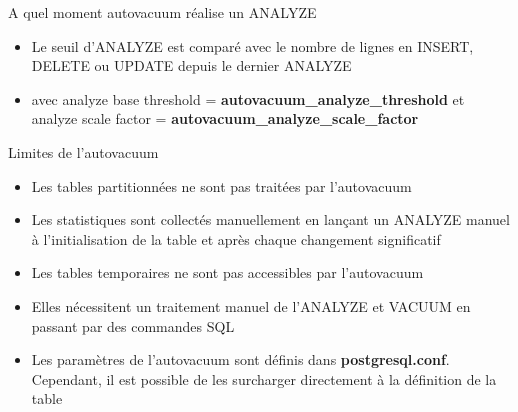 
\begin{frame}[fragile]{A quel moment autovacuum réalise un ANALYZE}

\begin{itemize}
\begin{tiny}
\begin{Verbatim}[commandchars=\\\{\}]
analyze threshold = analyze base threshold + analyze scale factor * number of tuples
\end{Verbatim}
\end{tiny}
   \item Le seuil d'ANALYZE est comparé avec le nombre de lignes en INSERT, DELETE ou UPDATE depuis le dernier ANALYZE
   \item avec analyze base threshold = \textbf{autovacuum\_analyze\_threshold} et analyze scale factor = \textbf{autovacuum\_analyze\_scale\_factor}

\end{itemize}

\end{frame}


\begin{frame}[fragile]{Limites de l'autovacuum}

\begin{itemize}
   \item Les tables partitionnées ne sont pas traitées par l'autovacuum
   \item Les statistiques sont collectés manuellement en lançant un ANALYZE manuel à l'initialisation de la table et après chaque changement significatif
   \item Les tables temporaires ne sont pas accessibles par l'autovacuum
   \item Elles nécessitent un traitement manuel de l'ANALYZE et VACUUM en passant par des commandes SQL
   \item Les paramètres de l'autovacuum sont définis dans \textbf{postgresql.conf}. Cependant, il est possible de les surcharger directement à la définition de la table

\end{itemize}

\begin{tiny}
\begin{toile}
\end{toile}
\end{tiny}

\end{frame}


